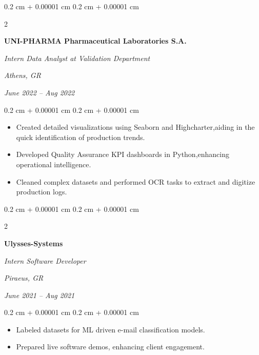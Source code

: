 \documentclass[10pt, letterpaper]{article}
\newenvironment{highlights}{
    \begin{itemize}[
        topsep=0.10 cm,
        parsep=0.10 cm,
        partopsep=0pt,
        itemsep=0pt,
        leftmargin=0.4 cm + 1pt
    ]
}{
    \end{itemize}
} %
\newenvironment{onecolentry}{
    \begin{adjustwidth}{
        0.2 cm + 0.00001 cm
    }{
        0.2 cm + 0.00001 cm
    }
}{
    \end{adjustwidth}
} %
\newenvironment{twocolentry}[2][]{
    \onecolentry
    \def\secondColumn{#2}
    \setcolumnwidth{\fill, 4.5 cm}
    \begin{paracol}{2}
}{
    \switchcolumn \raggedleft \secondColumn
    \end{paracol}
    \endonecolentry
} %
\begin{document}
        \vspace{0.08 cm}

        \begin{twocolentry}{
           
        \textit{Athens, GR}
        
        \textit{June 2022 – Aug 2022}}
            \textbf{UNI-PHARMA Pharmaceutical Laboratories S.A.}
            
            \textit{Intern Data Analyst at Validation Department}
        \end{twocolentry}

        \vspace{0.08 cm}
        \begin{onecolentry}
            \begin{highlights}
                \item Created detailed visualizations using Seaborn and Highcharter,aiding in the quick identification of production trends.
                \item Developed Quality Assurance KPI dashboards in Python,enhancing operational intelligence.
                \item Cleaned complex datasets and performed OCR tasks to extract and digitize production logs.
            \end{highlights}
        \end{onecolentry}

        \begin{twocolentry}{
            
        \textit{Piraeus, GR}
        
        \textit{June 2021 – Aug 2021}}
            \textbf{Ulysses-Systems}
            
            \textit{Intern Software Developer}
        \end{twocolentry}

        \vspace{0.08 cm}
        \begin{onecolentry}
            \begin{highlights}
                \item Labeled datasets for ML driven e-mail classification models.
                \item Prepared live software demos, enhancing client engagement.
            \end{highlights}
        \end{onecolentry}
\end{document}

